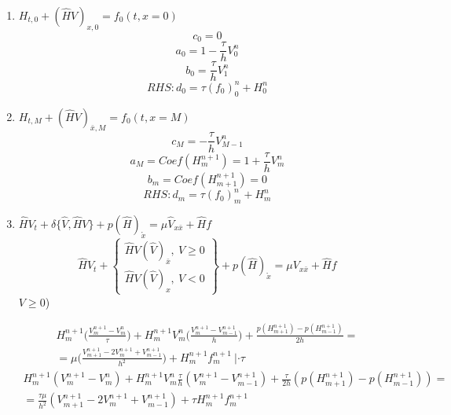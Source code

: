 \documentclass[12pt]{article}
\begin{document}
\begin{enumerate}
    \item $H_{t, 0} + (\hat HV)_{x, 0} = f_0 (t, x = 0)$
        \begin{equation}
        \displaystyle c_0 = 0
    \end{equation}
    \begin{equation}
        \displaystyle a_0 = 1 - \frac{\tau}{h}V^n_{0}
    \end{equation}
    \begin{equation}
        \displaystyle b_0 = \frac{\tau}{h}V^n_{1}
    \end{equation}
    \begin{equation}
        \displaystyle RHS : d_0 = \tau (f_0)^n_0 + H^n_0
    \end{equation}
    
    \item $H_{t, M} + (\hat HV)_{\bar{x}, M} = f_0 (t, x = M)$
        \begin{equation}
        \displaystyle c_M = - \frac{\tau}{h}V^n_{M-1}
    \end{equation}
    \begin{equation}
        \displaystyle a_M = Coef (H^{n+1}_{m}) = 1 + \frac{\tau}{h}V^n_{m}
    \end{equation}
    \begin{equation}
        \displaystyle b_m = Coef (H^{n+1}_{m+1}) = 0
    \end{equation}
    \begin{equation}
        \displaystyle RHS : d_m = \tau (f_0)^n_m + H^n_m
    \end{equation}
    
    \item $\hat HV_t + \delta\{\hat V, \hat HV\} + p(\hat H)_{\mathring{x}} = \mu \hat V_{x \bar{x}} + \hat{H}f$
    \begin{equation}
    \hat{H}V_t +
        \left\{
            \begin{array}{l}
                \hat{H}V(\hat{V})_{\bar{x}}, \ V \geq 0 \\
                \hat{H}V(\hat{V})_x, \ V < 0
            \end{array}
        \right\}
    +p(\hat{H})_{\mathring{x}} = \mu V_{x \bar{x}} + \hat{H}f
    \end{equation}
     $V \geq 0$)

\begin{align*}
    \displaystyle 
    H^{n+1}_m \Big( \frac{V^{n+1}_m - V^n_m}{\tau}\Big) + H^{n+1}_mV^n_m\Big( \frac{V^{n+1}_m - V^{n+1}_{m-1}}{h}\Big)  + \frac{p(H^{n+1}_{m+1}) - p(H^{n+1}_{m-1})}{2h} = \\ = \mu \Big( \frac{V^{n+1}_{m+1} - 2V^{n+1}_m + V^{n+1}_{m-1}}{h^2} \Big) + H^{n+1}_m f^{n+1}_m \ | \cdot \tau
\end{align*}
\begin{align*}
    \displaystyle 
    H^{n+1}_m ( V^{n+1}_m - V^n_m) + H^{n+1}_mV^n_m\frac{\tau}{h}(V^{n+1}_m - V^{n+1}_{m-1})  + \frac{\tau}{2h}(p(H^{n+1}_{m+1}) - p(H^{n+1}_{m-1})) = \\ = \frac{\tau \mu}{h^2} ( V^{n+1}_{m+1} - 2V^{n+1}_m + V^{n+1}_{m-1} ) + \tau H^{n+1}_m f^{n+1}_m
\end{align*}


\end{enumerate}
\end{document}
